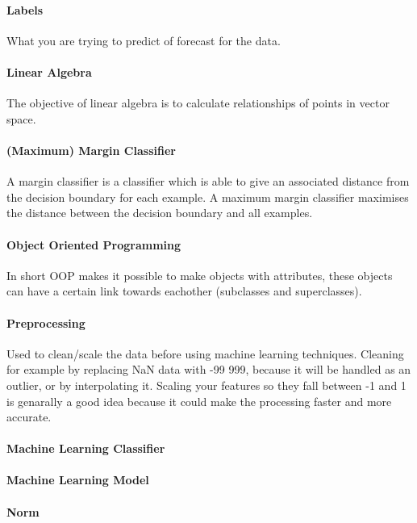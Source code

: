 \paragraph{Labels} 
What you are trying to predict of forecast for the data.

\paragraph{Linear Algebra} 
The objective of linear algebra is to calculate relationships of points in vector space. 

\paragraph{(Maximum) Margin Classifier}
A margin classifier is a classifier which is able to give an associated distance from the decision boundary for each example. A maximum margin classifier maximises the distance between the decision boundary and all examples.

\paragraph{Object Oriented Programming}
In short OOP makes it possible to make objects with attributes, these objects can have a certain link towards eachother (subclasses and superclasses).

\paragraph{Preprocessing} 
Used to clean/scale the data before using machine learning techniques. Cleaning for example by replacing NaN data with -99 999, because it will be handled as an outlier, or by interpolating it. Scaling your features so they fall between -1 and 1 is genarally a good idea because it could make the processing faster and more accurate.

\paragraph{Machine Learning Classifier} %

\paragraph{Machine Learning Model} %

\paragraph{Norm} %

